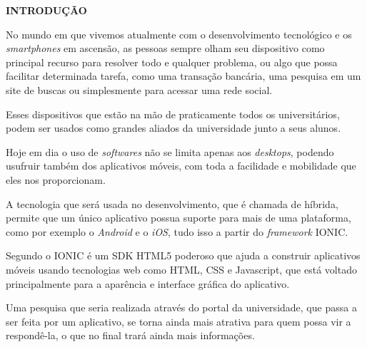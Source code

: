 \vspace{1.2em}
\textbf{\large INTRODUÇÃO}

\vspace{2.9em}
\thispagestyle{empty}


	\par No mundo em que vivemos atualmente com o desenvolvimento tecnológico e os \textit{smartphones} em ascensão, as pessoas sempre olham seu dispositivo como principal recurso para resolver todo e qualquer problema, ou algo que possa facilitar determinada tarefa, como uma transação bancária, uma pesquisa em um site de buscas ou simplesmente para acessar uma rede social.

	\par Esses dispositivos que estão na mão de praticamente todos os universitários, podem ser usados como grandes aliados da universidade junto a seus alunos.

	\par Hoje em dia o uso de \textit{softwares} não se limita apenas aos \textit{desktops}, podendo usufruir também dos aplicativos móveis, com toda a facilidade e mobilidade que eles nos proporcionam.

	\par A tecnologia que será usada no desenvolvimento, que é chamada de híbrida, permite que um único aplicativo possua suporte para mais de uma plataforma, como por exemplo o \textit{Android} e o \textit{iOS}, tudo isso a partir do \textit{framework} IONIC.

	\par Segundo  o IONIC é um SDK HTML5 poderoso que ajuda a construir aplicativos móveis usando tecnologias web como HTML, CSS e Javascript, que está voltado principalmente para a aparência e interface gráfica do aplicativo.

	\par Uma pesquisa que seria realizada através do portal da universidade, que passa a ser feita por um aplicativo, se torna ainda mais atrativa para quem possa vir a respondê-la, o que no final trará ainda mais informações.

